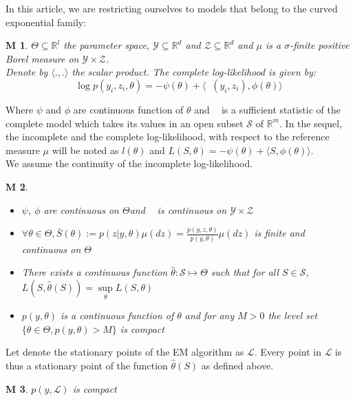 \documentclass{article}
\theoremstyle{plain}
\newtheorem{assumption}{M}
\DeclareMathOperator*{\St}{\tilde{S}}
\theoremstyle{plain}
\theoremstyle{definition}
\begin{document}
In this article, we are restricting ourselves to models that belong to the curved exponential family:
\begin{assumption}
$\Theta \subseteq \mathbb{R}^l$ the parameter space, $ \mathcal{Y} \subseteq \mathbb{R}^d$ and $\mathcal{Z} \subseteq \mathbb{R}^d$ and $\mu$ is a $\sigma$-finite positive Borel measure on $\mathcal{Y} \times \mathcal{Z}$.\\
Denote by $\langle . { , }. \rangle$ the scalar product. The complete log-likelihood is given by:
\begin{equation}
\log p(y_i,z_i,\theta) = -\psi(\theta) + \langle \St(y_i,z_i), \phi(\theta)\rangle
\end{equation}
\end{assumption}
Where $\psi$ and $\phi$ are continuous function of $\theta$ and $\St$ is a sufficient statistic of the complete model which takes its values in an open subset $\mathcal{S}$ of $\mathbb{R}^m$. In the sequel, the incomplete and the complete log-likelihood, with respect to the reference measure $\mu$ will be noted as $l(\theta)$ and $L(S,\theta) = -\psi(\theta) + \langle S, \phi(\theta)\rangle$.\\
We assume the continuity of the incomplete log-likelihood. 

\begin{assumption}
\begin{itemize}
\item $\psi$, $\phi$ are continuous on $\Theta$and $\St$ is continuous on $\mathcal{Y} \times \mathcal{Z}$
\item $\forall \theta \in \Theta, \bar{S}(\theta):= p(z|y,\theta)\mu(dz) = \frac{p(y,z,\theta)}{p(y,\theta)}\mu(dz)$ is finite and continuous on $\Theta$
\item There exists a continuous function $\hat{\theta}: \mathcal{S} \mapsto \Theta$ such that for all $S \in \mathcal{S}$, $L(S,\hat{\theta}(S)) = \sup \limits_{\theta} L(S,\theta)$
\item $p(y,\theta)$ is a continuous function of $\theta$ and for any $M > 0$ the level set $\{\theta \in \Theta, p(y,\theta) > M\}$ is compact
\end{itemize}
\end{assumption}


Let denote the stationary points of the EM algorithm as $\mathcal{L}$. Every point in $\mathcal{L}$ is thus a stationary point of the function $\hat{\theta}(S)$ as defined above.
\begin{assumption}
$p(y,\mathcal{L})$ is compact
\end{assumption}
\end{document}
